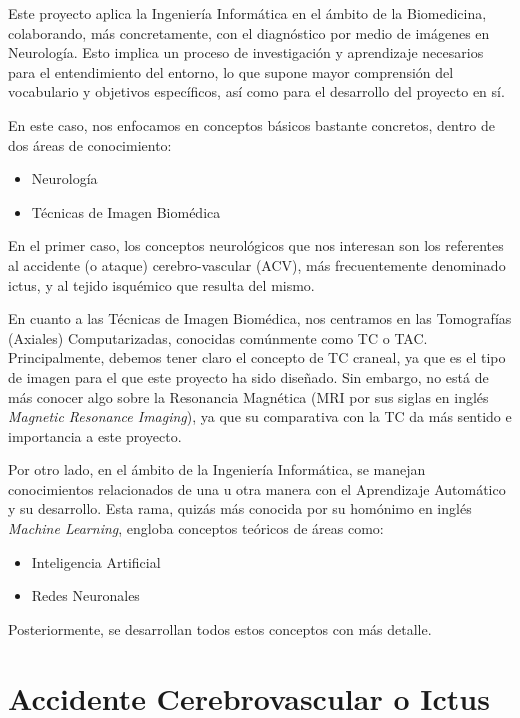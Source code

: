 
Este proyecto aplica la Ingeniería Informática en el ámbito de la Biomedicina, colaborando, más concretamente, con el diagnóstico por medio de imágenes en Neurología. Esto implica un proceso de investigación y aprendizaje necesarios para el entendimiento del entorno, lo que supone mayor comprensión del vocabulario y objetivos específicos, así como para el desarrollo del proyecto en sí.

En este caso, nos enfocamos en conceptos básicos bastante concretos, dentro de dos áreas de conocimiento:
\begin{itemize}
	\item Neurología
	\item Técnicas de Imagen Biomédica
\end{itemize}

En el primer caso, los conceptos neurológicos que nos interesan son los referentes al accidente (o ataque) cerebro-vascular (ACV), más frecuentemente denominado ictus, y al tejido isquémico que resulta del mismo.

En cuanto a las Técnicas de Imagen Biomédica, nos centramos en las Tomografías (Axiales) Computarizadas, conocidas comúnmente como TC o TAC. Principalmente, debemos tener claro el concepto de TC craneal, ya que es el tipo de imagen para el que este proyecto ha sido diseñado. Sin embargo, no está de más conocer algo sobre la Resonancia Magnética (MRI por sus siglas en inglés \textit{Magnetic Resonance Imaging}), ya que su comparativa con la TC da más sentido e importancia a este proyecto.

Por otro lado, en el ámbito de la Ingeniería Informática, se manejan conocimientos relacionados de una u otra manera con el Aprendizaje Automático y su desarrollo. Esta rama, quizás más conocida por su homónimo en inglés \textit{Machine Learning}, engloba conceptos teóricos de áreas como:

\begin{itemize}
	\item Inteligencia Artificial
	\item Redes Neuronales
\end{itemize}

Posteriormente, se desarrollan todos estos conceptos con más detalle.


\section{Accidente Cerebrovascular o Ictus}

